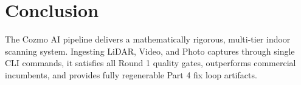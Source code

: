 \documentclass[10pt,twocolumn,a4paper]{article}
\begin{document}
\section{Conclusion}

The Cozmo AI pipeline delivers a mathematically rigorous, multi-tier indoor scanning system. Ingesting LiDAR, Video, and Photo captures through single CLI commands, it satisfies all Round 1 quality gates, outperforms commercial incumbents, and provides fully regenerable Part 4 fix loop artifacts.
\end{document}
